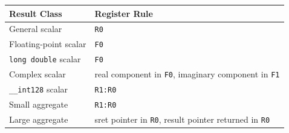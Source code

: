 \begingroup\footnotesize
\setlength{\tabcolsep}{2pt}
\begin{longtable}{@{}p{2.15in}p{3.35in}@{}}
\toprule
\textbf{Result Class} & \textbf{Register Rule}\\
\midrule
\endhead
General scalar & \texttt{R0}\\
Floating-point scalar & \texttt{F0}\\
\texttt{long double} scalar & \texttt{F0}\\
Complex scalar & real component in \texttt{F0}, imaginary component in \texttt{F1}\\
\texttt{\_\_int128} scalar & \texttt{R1:R0}\\
Small aggregate & \texttt{R1:R0}\\
Large aggregate & sret pointer in \texttt{R0}, result pointer returned in \texttt{R0}\\
\bottomrule
\end{longtable}
\endgroup
